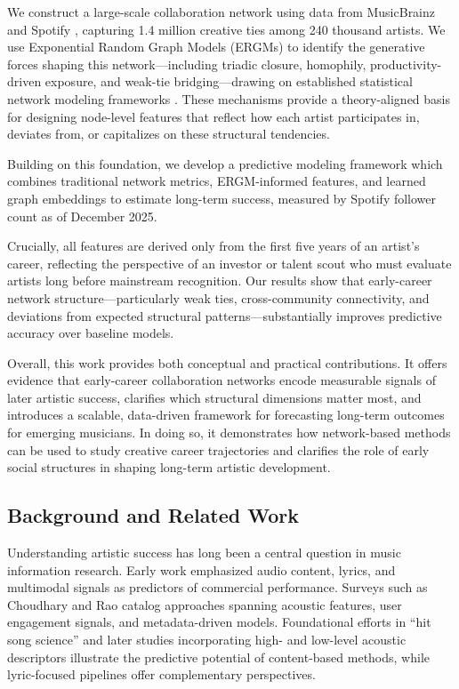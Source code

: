 \documentclass[fleqn,10pt]{wlscirep}
\begin{document}
We construct a large-scale collaboration network using data from MusicBrainz and Spotify \cite{MusicBrainz, SpotifyAPI}, capturing 1.4 million creative ties among 240 thousand artists. We use Exponential Random Graph Models (ERGMs) to identify the generative forces shaping this network---including triadic closure, homophily, productivity-driven exposure, and weak-tie bridging---drawing on established statistical network modeling frameworks \cite{Robins2007IntroERGM}. These mechanisms provide a theory-aligned basis for designing node-level features that reflect how each artist participates in, deviates from, or capitalizes on these structural tendencies.

Building on this foundation, we develop a predictive modeling framework which combines traditional network metrics, ERGM-informed features, and learned graph embeddings to estimate long-term success, measured by Spotify follower count as of December 2025.

Crucially, all features are derived only from the first five years of an artist’s career, reflecting the perspective of an investor or talent scout who must evaluate artists long before mainstream recognition. Our results show that early-career network structure---particularly weak ties, cross-community connectivity, and deviations from expected structural patterns---substantially improves predictive accuracy over baseline models.

Overall, this work provides both conceptual and practical contributions. It offers evidence that early-career collaboration networks encode measurable signals of later artistic success, clarifies which structural dimensions matter most, and introduces a scalable, data-driven framework for forecasting long-term outcomes for emerging musicians. In doing so, it demonstrates how network-based methods can be used to study creative career trajectories and clarifies the role of early social structures in shaping long-term artistic development.

\subsection*{Background and Related Work}

Understanding artistic success has long been a central question in music information research. Early work emphasized audio content, lyrics, and multimodal signals as predictors of commercial performance. Surveys such as Choudhary and Rao \cite{Choudhary2021Multimodal} catalog approaches spanning acoustic features, user engagement signals, and metadata-driven models. Foundational efforts in ``hit song science'' \cite{McVicar2011HitSongScience} and later studies incorporating high- and low-level acoustic descriptors \cite{Zangerle2019HitSongPrediction} illustrate the predictive potential of content-based methods, while lyric-focused pipelines \cite{Xue2014LyricsSuccess} offer complementary perspectives.
\end{document}
